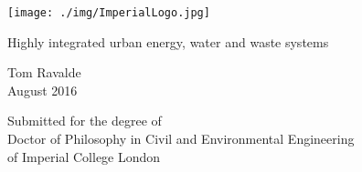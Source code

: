 \begin{titlepage}

  \texttt{[image: ./img/ImperialLogo.jpg]}\\[1cm]

    \begin{center}
        \vspace*{1cm}
        
        {\LARGE Highly integrated urban energy, water and waste systems}
        
        \vspace{1.5cm}
        
        Tom Ravalde \\
        \vspace{0.8cm}
        August 2016
        
        \vfill
        
        Submitted for the degree of \\
	Doctor of Philosophy in Civil and Environmental Engineering\\
	of Imperial College London
        
    \end{center}

\end{titlepage}
